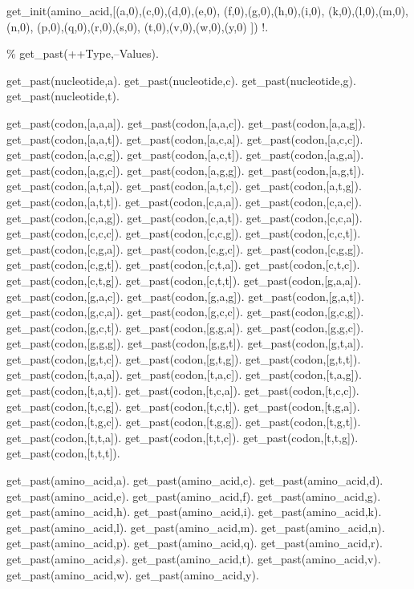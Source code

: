 \begin{center}
get_init(amino_acid,[(a,0),(c,0),(d,0),(e,0),
(f,0),(g,0),(h,0),(i,0),
(k,0),(l,0),(m,0),(n,0),
(p,0),(q,0),(r,0),(s,0),
(t,0),(v,0),(w,0),(y,0)
])\Sneck{}
!.
\end{center}

\% get_past(++Type,--Values).

get_past(nucleotide,a).
get_past(nucleotide,c).
get_past(nucleotide,g).
get_past(nucleotide,t).

get_past(codon,[a,a,a]).
get_past(codon,[a,a,c]).
get_past(codon,[a,a,g]).
get_past(codon,[a,a,t]).
get_past(codon,[a,c,a]).
get_past(codon,[a,c,c]).
get_past(codon,[a,c,g]).
get_past(codon,[a,c,t]).
get_past(codon,[a,g,a]).
get_past(codon,[a,g,c]).
get_past(codon,[a,g,g]).
get_past(codon,[a,g,t]).
get_past(codon,[a,t,a]).
get_past(codon,[a,t,c]).
get_past(codon,[a,t,g]).
get_past(codon,[a,t,t]).
get_past(codon,[c,a,a]).
get_past(codon,[c,a,c]).
get_past(codon,[c,a,g]).
get_past(codon,[c,a,t]).
get_past(codon,[c,c,a]).
get_past(codon,[c,c,c]).
get_past(codon,[c,c,g]).
get_past(codon,[c,c,t]).
get_past(codon,[c,g,a]).
get_past(codon,[c,g,c]).
get_past(codon,[c,g,g]).
get_past(codon,[c,g,t]).
get_past(codon,[c,t,a]).
get_past(codon,[c,t,c]).
get_past(codon,[c,t,g]).
get_past(codon,[c,t,t]).
get_past(codon,[g,a,a]).
get_past(codon,[g,a,c]).
get_past(codon,[g,a,g]).
get_past(codon,[g,a,t]).
get_past(codon,[g,c,a]).
get_past(codon,[g,c,c]).
get_past(codon,[g,c,g]).
get_past(codon,[g,c,t]).
get_past(codon,[g,g,a]).
get_past(codon,[g,g,c]).
get_past(codon,[g,g,g]).
get_past(codon,[g,g,t]).
get_past(codon,[g,t,a]).
get_past(codon,[g,t,c]).
get_past(codon,[g,t,g]).
get_past(codon,[g,t,t]).
get_past(codon,[t,a,a]).
get_past(codon,[t,a,c]).
get_past(codon,[t,a,g]).
get_past(codon,[t,a,t]).
get_past(codon,[t,c,a]).
get_past(codon,[t,c,c]).
get_past(codon,[t,c,g]).
get_past(codon,[t,c,t]).
get_past(codon,[t,g,a]).
get_past(codon,[t,g,c]).
get_past(codon,[t,g,g]).
get_past(codon,[t,g,t]).
get_past(codon,[t,t,a]).
get_past(codon,[t,t,c]).
get_past(codon,[t,t,g]).
get_past(codon,[t,t,t]).

get_past(amino_acid,a).
get_past(amino_acid,c).
get_past(amino_acid,d).
get_past(amino_acid,e).
get_past(amino_acid,f).
get_past(amino_acid,g).
get_past(amino_acid,h).
get_past(amino_acid,i).
get_past(amino_acid,k).
get_past(amino_acid,l).
get_past(amino_acid,m).
get_past(amino_acid,n).
get_past(amino_acid,p).
get_past(amino_acid,q).
get_past(amino_acid,r).
get_past(amino_acid,s).
get_past(amino_acid,t).
get_past(amino_acid,v).
get_past(amino_acid,w).
get_past(amino_acid,y).

